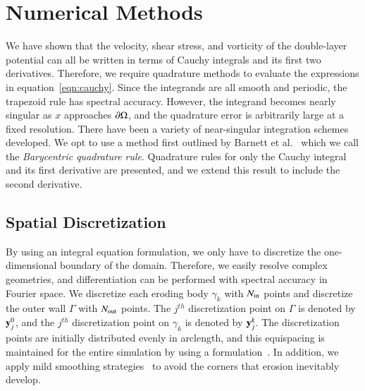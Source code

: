 \documentclass[preprint, 10pt]{elsarticle}
\begin{document}
\section{Numerical Methods}
\label{s:method}
We have shown that the velocity, shear stress, and vorticity of the
double-layer potential can all be written in terms of Cauchy integrals
and its first two derivatives.  Therefore, we require quadrature methods
to evaluate the expressions in equation~\eqref{eqn:cauchy}.  Since the
integrands are all smooth and periodic, the trapezoid rule has spectral
accuracy.  However, the integrand becomes nearly singular as $x$
approaches ${\partial}\Omega$, and the quadrature error is arbitrarily large at
a fixed resolution.  There have been a variety of near-singular
integration schemes developed.   We opt to use a method first outlined
by Barnett et al.~\cite{bar-wu-vee2015} which we call the {\em
Barycentric quadrature rule}.  Quadrature rules for only the Cauchy
integral and its first derivative are presented, and we extend this
result to include the second derivative.


\subsection{Spatial Discretization}
\label{s:spatialDiscretization}
By using an integral equation formulation, we only have to discretize
the one-dimensional boundary of the domain.  Therefore, we easily
resolve complex geometries, and differentiation can be performed with
spectral accuracy in Fourier space.  We discretize each eroding body
$\gamma_k$ with $N_{\mathrm{in}}$ points and discretize the outer wall $\Gamma$
with $N_{\mathrm{out}}$ points.  The $j^{th}$ discretization point on $\Gamma$ is
denoted by ${\mathbf{y}}_j^0$, and the $j^{th}$ discretization point on
$\gamma_k$ is denoted by ${\mathbf{y}}^k_j$.  The discretization points are
initially distributed evenly in arclength, and this equispacing is
maintained for the entire simulation by using a {\thL}
formulation~\cite{hou-low-she1994}.  In addition, we apply mild
smoothing strategies~\cite{qua-moo2018} to avoid the corners that
erosion inevitably develop.  
\end{document}
